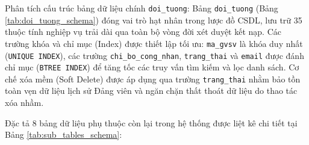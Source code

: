 \documentclass[12pt,a4paper]{report}
\begin{document}
Phân tích cấu trúc bảng dữ liệu chính \texttt{doi\_tuong}: Bảng \texttt{doi\_tuong} (Bảng \ref{tab:doi_tuong_schema}) đóng vai trò hạt nhân trong lược đồ CSDL, lưu trữ 35 thuộc tính nghiệp vụ trải dài qua toàn bộ vòng đời xét duyệt kết nạp. Các trường khóa và chỉ mục (Index) được thiết lập tối ưu: \texttt{ma\_gvsv} là khóa duy nhất (\texttt{UNIQUE INDEX}), các trường \texttt{chi\_bo\_cong\_nhan}, \texttt{trang\_thai} và \texttt{email} được đánh chỉ mục (\texttt{BTREE INDEX}) để tăng tốc các truy vấn tìm kiếm và lọc danh sách. Cơ chế xóa mềm (Soft Delete) được áp dụng qua trường \texttt{trang\_thai} nhằm bảo tồn toàn vẹn dữ liệu lịch sử Đảng viên và ngăn chặn thất thoát dữ liệu do thao tác xóa nhầm.

Đặc tả 8 bảng dữ liệu phụ thuộc còn lại trong hệ thống được liệt kê chi tiết tại Bảng \ref{tab:sub_tables_schema}:
\end{document}
